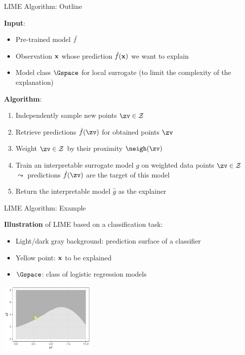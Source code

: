 \documentclass[10pt,compress,t,notes=noshow, xcolor=table]{beamer}
\newcommand{\gh}{\hat{g}}
\begin{document}
\begin{frame}[c]{LIME Algorithm: Outline}
		
		\textbf{Input}:
		\begin{itemize}
		    \item Pre-trained model $\hat{f}$
		    \item Observation $\mathbf{x}$ whose prediction $\hat{f}(\mathbf{x})$ we want to explain
		    \item Model class $\Gspace$ for local surrogate (to limit the complexity of the explanation)
		\end{itemize}
		
		\pause
		\medskip
		
		\textbf{Algorithm}:
		\begin{enumerate}
    		\item Independently sample new points $\zv \in \Zspace$ 
    		\item Retrieve predictions $\fh(\zv)$ for obtained points $\zv$ 
    		\item Weight $\zv \in \Zspace$ by their proximity $\neigh(\zv)$
    		\item Train an interpretable surrogate model $g$ on weighted data points $\zv \in \Zspace$\\ $\leadsto$ predictions $\fh(\zv)$ are the target of this model
    		\item Return the interpretable model $\gh$ as the explainer
		\end{enumerate}
		

	
\end{frame} 

\begin{frame}[c]{LIME Algorithm: Example}

    	\textbf{Illustration} of LIME based on a classification task:
		\begin{itemize}
			\item Light/dark gray background: prediction surface of a classifier
			\item Yellow point: $\mathbf{x}$ to be explained
			\item $\Gspace$: class of logistic regression models 
		\end{itemize}
		\begin{center}
			\includegraphics[width=0.35\textwidth]{figure/lime2}
		\end{center}

\end{frame} 
\end{document}
